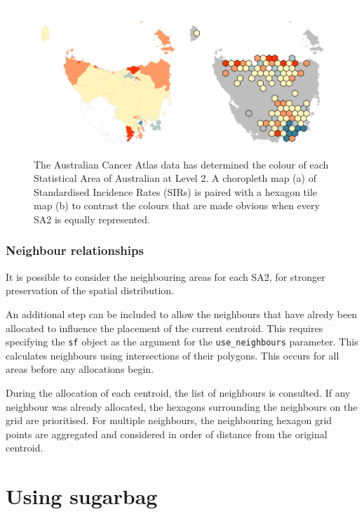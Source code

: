 \documentclass{monashthesis}
\begin{document}
\begin{figure}[H]
\centering
\includegraphics[width=16cm]{figures/03-algorithm/7SIR.png}
\caption{\label{fig:sir}The Australian Cancer Atlas data has determined the colour of each Statistical Area of Australian at Level 2. A choropleth map (a) of Standardised Incidence Rates (SIRs) is paired with a hexagon tile map (b) to contrast the colours that are made obvious when every SA2 is equally represented.}
\end{figure}

\hypertarget{neighbour-relationships}{%
\subsubsection{Neighbour relationships}\label{neighbour-relationships}}

It is possible to consider the neighbouring areas for each SA2, for stronger preservation of the spatial distribution.

An additional step can be included to allow the neighbours that have alredy been allocated to influence the placement of the current centroid.
This requires specifying the \texttt{sf} object as the argument for the \texttt{use\_neighbours} parameter. This calculates neighbours using intersections of their polygons. This occurs for all areas before any allocations begin.

During the allocation of each centroid, the list of neighbours is consulted. If any neighbour was already allocated, the hexagons surrounding the neighbours on the grid are prioritised. For multiple neighbours, the neighbouring hexagon grid points are aggregated and considered in order of distance from the original centroid.

\hypertarget{using-sugarbag}{%
\section{Using sugarbag}\label{using-sugarbag}}
\end{document}
